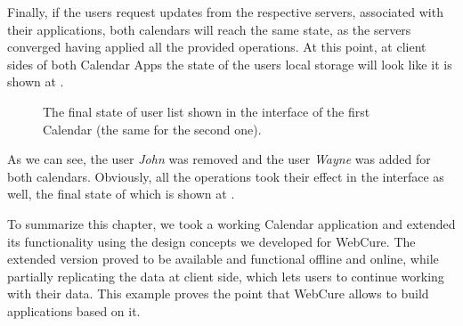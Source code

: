 Finally, if the users request updates from the respective servers, associated with their applications, both calendars will reach the same state, as the servers converged having applied all the provided operations. At this point, at client sides of both Calendar Apps the state of the users local storage will look like it is shown at .

\begin{figure}[!htb]
    \begin{center}
    \setlength{\fboxsep}{4pt}%
    \setlength{\fboxrule}{1pt}%
    {\scriptsize%
     }
    \caption {The final state of user list shown in the interface of the first Calendar (the same for the second one).}
    \label{fig:ev-fig-3}
\end{center}
\end{figure}

As we can see, the user \textit{John} was removed and the user \textit{Wayne} was added for both calendars. Obviously, all the operations took their effect in the interface as well, the final state of which is shown at .

To summarize this chapter, we took a working Calendar application and extended its functionality using the design concepts we developed for WebCure. The extended version proved to be available and functional offline and online, while partially replicating the data at client side, which lets users to continue working with their data. This example proves the point that WebCure allows to build applications based on it.